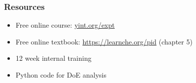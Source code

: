 \documentclass[11pt,aspectratio=169,mathserif]{beamer}
\begin{document}
\begin{frame}\frametitle{Resources}
	\begin{itemize}
		\item	Free online course: \href{http://yint.org/expt}{yint.org/expt}
		\item	Free online textbook: \href{https://learnche.org/pid/design-analysis-experiments/index}{https://learnche.org/pid} (chapter 5)
		\item	12 week internal training
		\item	Python code for DoE analysis
	\end{itemize}
\end{frame}

\iffalse
\begin{itemize}
	\item   Collapsability sequence
	\item 	Interaction: what is?
	\item 	Tradeoff: 4 factors and 5 expts. But with 8 expts you can docs lot more
	  - tradeoff: uncertainty from materials, people, or equipment.
	  \item   blocking: in the tradeoff table
	\item 	Randomization is important
	\item 	Interaction plots
	\item 	Contour plot concept
	\item 	Disturbance and covariates	
	\item 	Slide 283 for fraction factorial
	\item 	Rsm example walk through, incl slide 521. All models useful
	\item 	Cost approach incl slide 491
	\item 	When things go wrong you have fallback if you had those extra experiments
\end{itemize}
\fi
\end{document}
